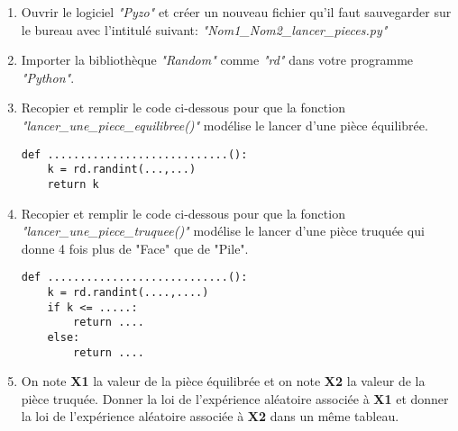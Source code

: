 \documentclass[11pt,a4paper]{book}
\begin{document}
	\begin{enumerate}
		\item Ouvrir le logiciel \emph{"Pyzo"} et créer un nouveau fichier qu'il faut sauvegarder sur le bureau avec l'intitulé suivant: \emph{"Nom1\_Nom2\_lancer\_pieces.py"}\\
		\item Importer la bibliothèque \emph{"Random"} comme \emph{"rd"} dans votre programme \emph{"Python"}.\\
		\item Recopier et remplir le code ci-dessous pour que la fonction \emph{"lancer\_une\_piece\_equilibree()" } modélise le lancer d'une pièce équilibrée.
		
\begin{lstlisting}[style=stylepython]
def ............................():
	k = rd.randint(...,...)
	return k			
\end{lstlisting}
		
		\item Recopier et remplir le code ci-dessous pour que la fonction \emph{"lancer\_une\_piece\_truquee()" } modélise le lancer d'une pièce truquée qui donne 4 fois plus de "Face" que de "Pile". 
		
\begin{lstlisting}[style=stylepython]
def ............................():
	k = rd.randint(....,....)
	if k <= .....:
		return ....
	else:
		return ....			
\end{lstlisting}
		\item On note \textbf{X1} la valeur de la pièce équilibrée et on note \textbf{X2} la valeur de la pièce truquée. Donner la loi de l'expérience aléatoire associée à \textbf{X1} et donner la loi de l'expérience aléatoire associée à \textbf{X2} dans un même tableau. \\
		

\end{enumerate}
\end{document}
